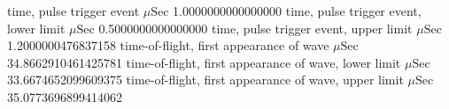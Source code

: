 \expandafter\def\csname oct2tex.water_d50_v800_P.t0.d\endcsname{time, pulse trigger event}
\expandafter\def\csname oct2tex.water_d50_v800_P.t0.u\endcsname{\ensuremath{\mu\text{Sec}}}
\expandafter\def\csname oct2tex.water_d50_v800_P.t0.v\endcsname{1.0000000000000000}
\expandafter\def\csname oct2tex.water_d50_v800_P.t0a.d\endcsname{time, pulse trigger event, lower limit}
\expandafter\def\csname oct2tex.water_d50_v800_P.t0a.u\endcsname{\ensuremath{\mu\text{Sec}}}
\expandafter\def\csname oct2tex.water_d50_v800_P.t0a.v\endcsname{0.5000000000000000}
\expandafter\def\csname oct2tex.water_d50_v800_P.t0b.d\endcsname{time, pulse trigger event, upper limit}
\expandafter\def\csname oct2tex.water_d50_v800_P.t0b.u\endcsname{\ensuremath{\mu\text{Sec}}}
\expandafter\def\csname oct2tex.water_d50_v800_P.t0b.v\endcsname{1.2000000476837158}
\expandafter\def\csname oct2tex.water_d50_v800_P.t1.d\endcsname{time-of-flight, first appearance of wave}
\expandafter\def\csname oct2tex.water_d50_v800_P.t1.u\endcsname{\ensuremath{\mu\text{Sec}}}
\expandafter\def\csname oct2tex.water_d50_v800_P.t1.v\endcsname{34.8662910461425781}
\expandafter\def\csname oct2tex.water_d50_v800_P.t1a.d\endcsname{time-of-flight, first appearance of wave, lower limit}
\expandafter\def\csname oct2tex.water_d50_v800_P.t1a.u\endcsname{\ensuremath{\mu\text{Sec}}}
\expandafter\def\csname oct2tex.water_d50_v800_P.t1a.v\endcsname{33.6674652099609375}
\expandafter\def\csname oct2tex.water_d50_v800_P.t1b.d\endcsname{time-of-flight, first appearance of wave, upper limit}
\expandafter\def\csname oct2tex.water_d50_v800_P.t1b.u\endcsname{\ensuremath{\mu\text{Sec}}}
\expandafter\def\csname oct2tex.water_d50_v800_P.t1b.v\endcsname{35.0773696899414062}
